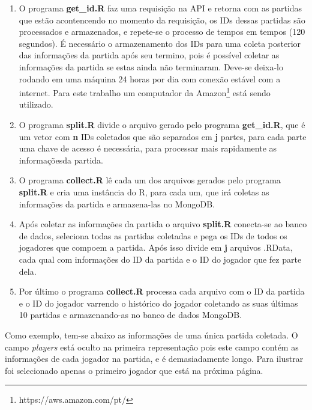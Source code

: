 \documentclass[
12pt,				%
openright,			%
oneside,			%
a4paper,			%
english,			%
brazil,				%
]{abntex2}
\begin{document}
\begin{enumerate}
\item O programa \textbf{get\_id.R} faz uma requisição na API e retorna com as
  partidas que estão acontencendo no momento da requisição, os IDs dessas
  partidas são processados e armazenados, e repete-se o processo de tempos em
  tempos (120 segundos). É necessário o armazenamento dos IDs para uma coleta
  posterior das informações da partida após seu termino, pois é possível
  coletar as informações da partida se estas ainda não terminaram. Deve-se
  deixa-lo rodando em uma máquina 24 horas por dia com conexão estável com a
  internet. Para este trabalho um computador da
  Amazon\footnote{https://aws.amazon.com/pt/} está sendo utilizado.

\item O programa \textbf{split.R} divide o arquivo  gerado pelo programa
  \textbf{get\_id.R}, que é um vetor com \textbf{n} IDs coletados que são
  separados em \textbf{j} partes, para cada parte uma chave de acesso é
  necessária, para processar mais rapidamente as informaçõesda partida.

\item O programa \textbf{collect.R} lê cada um dos arquivos gerados pelo
  programa \textbf{split.R} e cria uma instância do R, para cada um, que irá
  coletas as informações da partida e armazena-las no MongoDB.

\item Após coletar as informações da partida o arquivo \textbf{split.R}
  conecta-se ao banco de dados, seleciona todas as partidas coletadas e pega os
  IDs de todos os jogadores que compoem a partida. Após isso divide em
  \textbf{j} arquivos .RData, cada qual com informações do ID da partida e o ID
  do jogador que fez parte dela.

\item Por último o programa \textbf{collect.R} processa cada arquivo com o ID da
  partida e o ID do jogador varrendo o histórico do jogador coletando as suas
  últimas 10 partidas e armazenando-as no banco de dados MongoDB.

\end{enumerate}

Como exemplo, tem-se abaixo as informações de uma única partida coletada. O
campo \emph{players} está oculto na primeira representação pois este campo
contém as informações de cada jogador na partida, e é demasiadamente longo.
Para ilustrar foi selecionado apenas o primeiro jogador que está na próxima
página.
\end{document}
